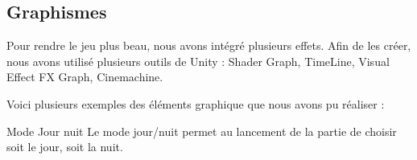 \subsection{Graphismes}

Pour rendre le jeu plus beau, nous avons intégré plusieurs effets.
Afin de les créer, nous avons utilisé plusieurs outils de Unity :
Shader Graph, TimeLine, Visual Effect FX Graph, Cinemachine.

Voici plusieurs exemples des éléments graphique que nous avons pu réaliser : 




Mode Jour nuit
Le mode jour/nuit permet au lancement de la partie
de choisir soit le jour, soit la nuit.
